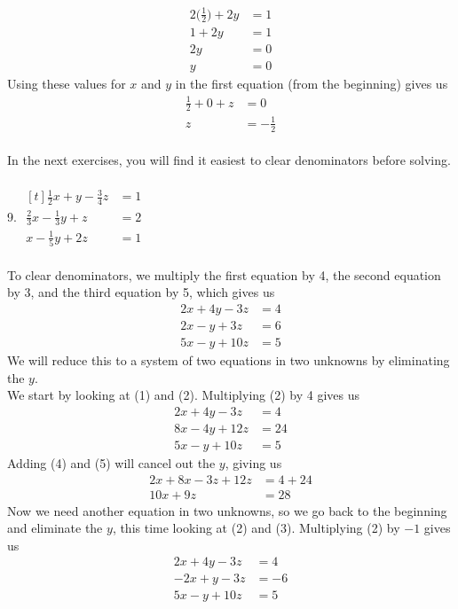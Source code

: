 \documentclass[12pt]{article}
\begin{document}
\begin{align*}
2\bigg(\displaystyle \frac{1}{2}\bigg)+2y&=1 \\
1+2y&=1 \\
2y&=0 \\
y&=0
\end{align*}
Using these values for $x$ and $y$ in the first equation (from the beginning) gives us
\begin{align*}
\displaystyle \frac{1}{2}+0+z&=0 \\
z&=-\displaystyle \frac{1}{2}
\end{align*}
\\
In the next exercises, you will find it easiest to clear denominators before solving. \\
\\
9. $\begin{aligned}[t]
\frac{1}{2}x+y-\frac{3}{4}z&=1 \\
\frac{2}{3}x-\frac{1}{3}y+z&=2 \\
x-\frac{1}{5}y+2z&=1
\end{aligned}$ \\
\\
To clear denominators, we multiply the first equation by 4, the second equation by 3, and the third equation by 5, which gives us
\begin{align}
2x+4y-3z&=4 \\
2x-y+3z&=6 \\
5x-y+10z&=5
\end{align}
We will reduce this to a system of two equations in two unknowns by eliminating the $y$. \\
We start by looking at (1) and (2). Multiplying (2) by 4 gives us
\begin{align}
2x+4y-3z&=4 \\
8x-4y+12z&=24 \\
5x-y+10z&=5
\end{align}
Adding (4) and (5) will cancel out the $y$, giving us
\begin{align}
2x+8x-3z+12z&=4+24 \\
10x+9z&=28
\end{align}
Now we need another equation in two unknowns, so we go back to the beginning and eliminate the $y$, this time looking at (2) and (3). Multiplying (2) by $-1$ gives us
\begin{align}
2x+4y-3z&=4 \\
-2x+y-3z&=-6 \\
5x-y+10z&=5
\end{align}
\end{document}
